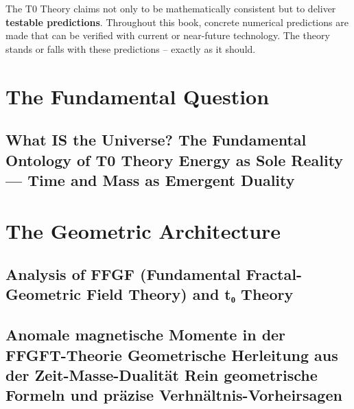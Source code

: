 \documentclass[11pt,openright,twoside]{book}
\begin{document}
\bigskip

The T0 Theory claims not only to be mathematically consistent but to deliver \textbf{testable predictions}. Throughout this book, concrete numerical predictions are made that can be verified with current or near-future technology. The theory stands or falls with these predictions -- exactly as it should.

\tableofcontents

\mainmatter
\pagestyle{fancy}

\part{The Fundamental Question}

\chapter{What IS the Universe? The Fundamental Ontology of T0 Theory Energy as Sole Reality — Time and Mass as Emergent Duality}


\part{The Geometric Architecture}

\chapter{Analysis of FFGF (Fundamental Fractal-Geometric Field Theory) and t₀ Theory}


\chapter{Anomale magnetische Momente in der FFGFT-Theorie Geometrische Herleitung aus der Zeit-Masse-Dualität Rein geometrische Formeln und präzise Verhnältnis-Vorheirsagen}

\end{document}
